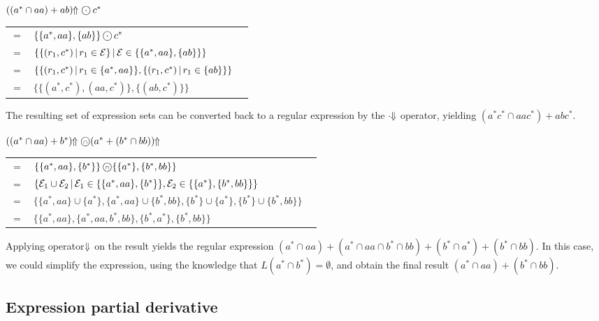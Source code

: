\needspace{2cm}
\begin{eg}
   $((a^* \cap aa) + ab)\esetsOfRe \circledcdot c^*$

   \begin{tabular}{lll}
      $=$ &
         $\{\{a^*, aa\}, \{ab\}\} \circledcdot c^*$
      \\ $=$ &
         $\{ \{ (r_1, c^*) \operatorname{|} r_1 \in \mathcal{E} \} \operatorname{|} \mathcal{E} \in \{\{a^*, aa\}, \{ab\}\} \}$
      \\ $=$ &
         $\{ \{ (r_1, c^*) \operatorname{|} r_1 \in \{a^*, aa\} \}, \{ (r_1, c^*) \operatorname{|} r_1 \in \{ab\} \} \}$
      \\ $=$ &
         $\{ \{ (a^*, c^*), (aa, c^*) \}, \{ (ab, c^*) \} \}$
   \end{tabular}

   The resulting set of expression sets can be converted back to a regular
   expression by the $\cdot\!\!\Downarrow$ operator, yielding $(a^*c^* \cap aac^*) +
   abc^*$.
\end{eg}

\begin{eg}
   $((a^* \cap aa) + b^*)\!\!\Uparrow \operatorname{\text{\textcircled{\tiny$\cap$}}} (a^* + (b^* \cap bb))\!\!\Uparrow$

   \begin{tabular}{lll}
      $=$ &
         $\{\{a^*, aa\}, \{b^*\}\} \operatorname{\text{\textcircled{\tiny$\cap$}}} \{\{a^*\}, \{b^*, bb\}\}$
      \\ $=$ &
         $\{
            \mathcal{E}_1 \cup \mathcal{E}_2
            \operatorname{|} \mathcal{E}_1 \in \{\{a^*, aa\}, \{b^*\}\}
            , \mathcal{E}_2 \in \{\{a^*\}, \{b^*, bb\}\}
         \}$
      \\ $=$ &
         $\{
            \{a^*, aa\} \cup \{a^*\},
            \{a^*, aa\} \cup \{b^*, bb\},
            \{b^*\} \cup \{a^*\},
            \{b^*\} \cup \{b^*, bb\}
          \}$
      \\ $=$ &
         $\{
            \{a^*, aa\},
            \{a^*, aa, b^*, bb\},
            \{b^*, a^*\},
            \{b^*, bb\}
          \}$
   \end{tabular}

   Applying operator $\!\!\Downarrow$ on the result yields the regular expression
   $(a^* \cap aa) + (a^* \cap aa \cap b^* \cap bb) + (b^* \cap a^*) + (b^* \cap
   bb)$. In this case, we could simplify the expression, using the knowledge
   that $L(a^* \cap b^*) = \emptyset$, and obtain the final result $(a^* \cap
   aa) + (b^* \cap bb)$.
\end{eg}


\subsection{Expression partial derivative}

